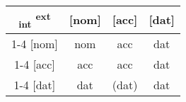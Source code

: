 
\begin{tabular}{c|c|c|c}
  \toprule
      \textsubscript{\ac{int}} \textsuperscript{\ac{ext}}
        & [\ac{nom}]
        & [\ac{acc}]
        & [\ac{dat}]
        \\ \cmidrule{1-4}
    [\ac{nom}]
        & \ac{nom}
        & \ac{acc}
        & \ac{dat}
        \\ \cmidrule{1-4}
    [\ac{acc}]
        & \ac{acc}
        & \ac{acc}
        & \ac{dat}
        \\ \cmidrule{1-4}
    [\ac{dat}]
        & \ac{dat}
        & (\ac{dat})
        & \ac{dat}
        \\
  \bottomrule
\end{tabular}
